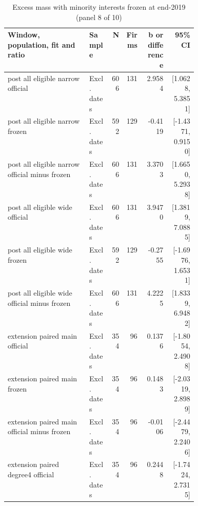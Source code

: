 \begin{table}[!htbp]\centering\scriptsize
\caption{Excess mass with minority interests frozen at end-2019 (panel 8 of 10)}
\begin{threeparttable}
\begin{tabular}{p{0.43\linewidth}lrrrr}
\toprule
Window, population, fit and ratio & Sample & N & Firms & b or difference & 95\% CI \\
\midrule
post all eligible narrow official & Excl. dates & 606 & 131 & 2.9584 & [1.0628, 5.3851] \\
post all eligible narrow frozen & Excl. dates & 592 & 129 & -0.4119 & [-1.4371, 0.9150] \\
post all eligible narrow official minus frozen & Excl. dates & 606 & 131 & 3.3703 & [1.6650, 5.2938] \\
post all eligible wide official & Excl. dates & 606 & 131 & 3.9470 & [1.3819, 7.0885] \\
post all eligible wide frozen & Excl. dates & 592 & 129 & -0.2755 & [-1.6976, 1.6531] \\
post all eligible wide official minus frozen & Excl. dates & 606 & 131 & 4.2225 & [1.8339, 6.9482] \\
extension paired main official & Excl. dates & 354 & 96 & 0.1376 & [-1.8054, 2.4908] \\
extension paired main frozen & Excl. dates & 354 & 96 & 0.1483 & [-2.0319, 2.8989] \\
extension paired main official minus frozen & Excl. dates & 354 & 96 & -0.0106 & [-2.4479, 2.2406] \\
extension paired degree4 official & Excl. dates & 354 & 96 & 0.2448 & [-1.7424, 2.7315] \\
\bottomrule
\end{tabular}
\begin{tablenotes}[flushleft]\footnotesize

\end{tablenotes}
\end{threeparttable}
\end{table}
